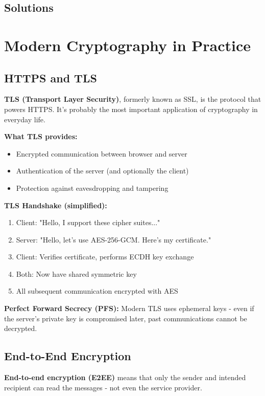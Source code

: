 \documentclass[11pt,a4paper]{report}
\begin{document}
\newpage
\section{Solutions}
\printcursols
\newpage
\chapter{Modern Cryptography in Practice}

\section{HTTPS and TLS}

\textbf{TLS (Transport Layer Security)}, formerly known as SSL, is the protocol that powers HTTPS. It's probably the most important application of cryptography in everyday life.

\textbf{What TLS provides:}
\begin{itemize}
\item Encrypted communication between browser and server
\item Authentication of the server (and optionally the client)
\item Protection against eavesdropping and tampering
\end{itemize}

\textbf{TLS Handshake (simplified):}
\begin{enumerate}
\item Client: "Hello, I support these cipher suites..."
\item Server: "Hello, let's use AES-256-GCM. Here's my certificate."
\item Client: Verifies certificate, performs ECDH key exchange
\item Both: Now have shared symmetric key
\item All subsequent communication encrypted with AES
\end{enumerate}

\textbf{Perfect Forward Secrecy (PFS):}
Modern TLS uses ephemeral keys - even if the server's private key is compromised later, past communications cannot be decrypted.

\section{End-to-End Encryption}

\textbf{End-to-end encryption (E2EE)} means that only the sender and intended recipient can read the messages - not even the service provider.
\end{document}
